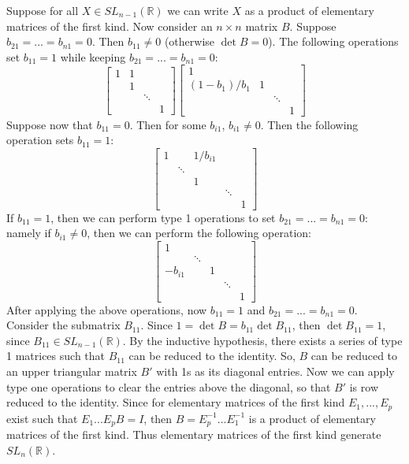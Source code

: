 \begin{itemize}
\begin{itemize}
Suppose for all $X \in SL_{n-1}(\mathbb{R})$ we can write $X$ as a product of elementary matrices of the first kind. Now consider an $n \times n$ matrix $B$. Suppose $b_{21} = ... = b_{n1} = 0$. Then $b_{11} \neq 0$ (otherwise $\det B = 0$). The following operations set $b_{11} = 1$ while keeping $b_{21} = ... = b_{n1} = 0$:
$$ \begin{bmatrix}
1 & 1 \\
& 1 \\
& & \ddots \\
& & & 1
\end{bmatrix}\begin{bmatrix}
1 \\
(1-b_1)/b_1 & 1 \\
& & \ddots \\
& & & 1
\end{bmatrix}$$
Suppose now that $b_{11} = 0$. Then for some $b_{i1}$, $b_{i1} \neq 0$. Then the following operation sets $b_{11} = 1$:
$$\begin{bmatrix}
1 & & 1/b_{i1} \\
& \ddots \\
& & 1 \\
& & & \ddots \\
& & & & 1
\end{bmatrix}$$
If $b_{11} = 1$, then we can perform type 1 operations to set $b_{21} = ... = b_{n1} = 0$: namely if $b_{i1} \neq 0$, then we can perform the following operation:
$$\begin{bmatrix}
1 \\
& \ddots \\
-b_{i1} & & 1 \\
& & & \ddots \\
& & & & 1
\end{bmatrix}$$
After applying the above operations, now $b_{11} = 1$ and $b_{21} = ... = b_{n1} = 0$. Consider the submatrix $B_{11}$. Since $1 = \det B = b_{11}\det B_{11}$, then $\det B_{11} = 1$, since $B_{11} \in SL_{n-1}(\mathbb{R})$. By the inductive hypothesis, there exists a series of type 1 matrices such that $B_{11}$ can be reduced to the identity. So, $B$ can be reduced to an upper triangular matrix $B'$ with 1s as its diagonal entries. Now we can apply type one operations to clear the entries above the diagonal, so that $B'$ is row reduced to the identity. Since for elementary matrices of the first kind $E_1, ..., E_p$ exist such that $E_1...E_pB = I$, then $B = E_p^{-1}...E_1^{-1}$ is a product of elementary matrices of the first kind. Thus elementary matrices of the first kind generate $SL_n(\mathbb{R})$.

\end{itemize}
\end{itemize}

